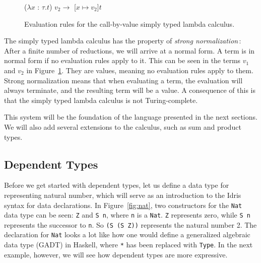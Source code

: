 \begin{center}
\begin{figure}

\begin{prooftree}
\end{prooftree}

\begin{prooftree}
\end{prooftree}

\begin{center}
($\lambda x$ : $\tau.t$) $v_{2} \longrightarrow$ [$x\mapsto v_{2}$]$t$ 
\end{center}

\caption{Evaluation rules for the call-by-value simply typed lambda calculus.}
\label{fig:simple-evaluation-rules}

\end{figure}
\end{center}

The simply typed lambda calculus has the property of \emph{strong normalization}\,\cite[pp. 149]{Pierce:TypeSystems}: After a finite number of reductions, we will arrive at a normal form. A term is in normal form if no evaluation rules apply to it. This can be seen in the terms $v_{1}$ and $v_{2}$ in Figure~\ref{fig:simple-evaluation-rules}. They are values, meaning no evaluation rules apply to them. Strong normalization means that when evaluating a term, the evaluation will always terminate, and the resulting term will be a value. A consequence of this is that the simply typed lambda calculus is not Turing-complete.

This system will be the foundation of the language presented in the next sections. We will also add several extensions to the calculus, such as sum and product types.

\subsection{Dependent Types}
\label{sec:dependent-types-idris}
Before we get started with dependent types, let us define a data type for representing natural number, which will serve as an introduction to the Idris syntax for data declarations. In Figure~\ref{fig:nat}, two constructors for the \texttt{Nat} data type can be seen: \texttt{Z} and \texttt{S n}, where \texttt{n} is a \texttt{Nat}. \texttt{Z} represents zero, while \texttt{S n} represents the successor to \texttt{n}. So \texttt{(S (S Z))} represents the natural number 2. The declaration for \texttt{Nat} looks a lot like how one would define a generalized algebraic data type (GADT) in Haskell, where \texttt{*} has been replaced with \texttt{Type}. In the next example, however, we will see how dependent types are more expressive.


